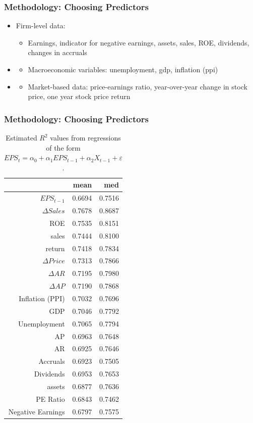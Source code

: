 \documentclass{beamer}
\newcommand\Fontvi{\fontsize{8}{7.2}\selectfont}
\begin{document}
\begin{frame}
\frametitle{Methodology: Choosing Predictors}
\begin{itemize}
\item Firm-level data: \begin{itemize}\item Earnings, indicator for negative earnings, assets, sales, ROE, dividends, changes in accruals\end{itemize}
\item \begin{itemize}\item Macroeconomic variables: unemployment, gdp, inflation (ppi)\end{itemize}
\item \begin{itemize}\item Market-based data: price-earnings ratio, year-over-year change in stock price, one year stock price return\end{itemize}
\end{itemize}
\end{frame}

\begin{frame}
\frametitle{Methodology: Choosing Predictors}

\begin{table}
\centering
\Fontvi
\begin{tabular}{rrr}
  \hline
 & mean & med \\
  \hline
$EPS_{t-1}$ & 0.6694 & 0.7516 \\
$\Delta Sales$ & 0.7678 & 0.8687 \\
ROE & 0.7535 & 0.8151 \\
sales & 0.7444 & 0.8100 \\
return & 0.7418 & 0.7834 \\
$\Delta Price$ & 0.7313 & 0.7866 \\
$\Delta AR$ & 0.7195 & 0.7980 \\
$\Delta AP$ & 0.7190 & 0.7868 \\
Inflation (PPI) & 0.7032 & 0.7696 \\
GDP & 0.7046 & 0.7792 \\
Unemployment & 0.7065 & 0.7794 \\
AP & 0.6963 & 0.7648 \\
AR & 0.6925 & 0.7646 \\
Accruals & 0.6923 & 0.7505 \\
Dividends & 0.6953 & 0.7653 \\
assets & 0.6877 & 0.7636 \\
PE Ratio & 0.6843 & 0.7462 \\
Negative Earnings & 0.6797 & 0.7575 \\
   \hline
\end{tabular}
\caption{Estimated $R^2$ values from regressions of the form $EPS_{t} = \alpha_0 + \alpha_{1}EPS_{t-1} + \alpha_{2}X_{t-1} +\varepsilon$.} 
\label{univariate-stats-eps}
\end{table}
\end{frame}
\end{document}
